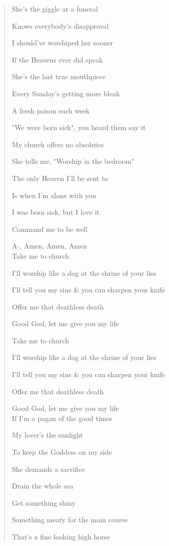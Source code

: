 \documentclass{article}
\begin{document}
\begin{enumerate}
\begin{quotation}
		She's the giggle at a funeral
		
		Knows everybody's disapproval
		
		I should've worshiped her sooner
		
		If the Heavens ever did speak
		
		She's the last true mouthpiece
		
		Every Sunday's getting more bleak
		
		A fresh poison each week
		
		"We were born sick", you heard them say it
		
		My church offers no absolutes
		
		She tells me, "Worship in the bedroom"
		
		The only Heaven I'll be sent to
		
		Is when I'm alone with you
		
		I was born sick, but I love it
		
		Command me to be well
		
		A-, Amen, Amen, Amen
		\\
		
		Take me to church
		
		I'll worship like a dog at the shrine of your lies
		
		I'll tell you my sins \& you can sharpen your knife
		
		Offer me that deathless death
		
		Good God, let me give you my life
		
		Take me to church
		
		I'll worship like a dog at the shrine of your lies
		
		I'll tell you my sins \& you can sharpen your knife
		
		Offer me that deathless death
		
		Good God, let me give you my life
		\\
		
		If I'm a pagan of the good times
		
		My lover's the sunlight
		
		To keep the Goddess on my side
		
		She demands a sacrifice
		
		Drain the whole sea
		
		Get something shiny
		
		Something meaty for the main course
		
		That's a fine looking high horse
		

\end{quotation}
\end{enumerate}
\end{document}
